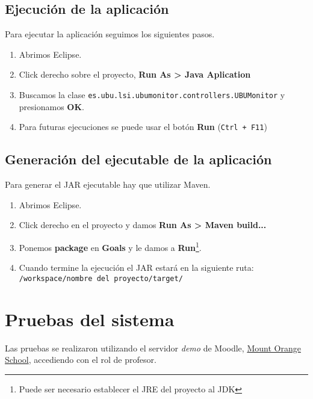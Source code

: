 \subsection{Ejecución de la aplicación}
Para ejecutar la aplicación seguimos los siguientes pasos.
\begin{enumerate}
	\item Abrimos Eclipse.
	\item Click derecho sobre el proyecto, \textbf{Run As > Java Aplication}
	\item Buscamos la clase \texttt{es.ubu.lsi.ubumonitor.controllers.UBUMonitor} y presionamos \textbf{OK}.
	\item Para futuras ejecuciones se puede usar el botón \textbf{Run} (\texttt{Ctrl + F11})
\end{enumerate}

\subsection{Generación del ejecutable de la aplicación}
Para generar el JAR ejecutable hay que utilizar Maven.
\begin{enumerate}
	\item Abrimos Eclipse.
	\item Click derecho en el proyecto y damos \textbf{Run As > Maven build...}
	\item Ponemos \textbf{package} en \textbf{Goals} y le damos a \textbf{Run}\footnote{Puede ser necesario establecer el JRE del proyecto al JDK}.
	\item Cuando termine la ejecución el JAR estará en la siguiente ruta: \texttt{/workspace/nombre del proyecto/target/}
\end{enumerate}

\section{Pruebas del sistema}
Las pruebas se realizaron utilizando el servidor \emph{demo} de Moodle, \href{https://school.moodledemo.net/}{Mount Orange School}, accediendo con el rol de profesor.

